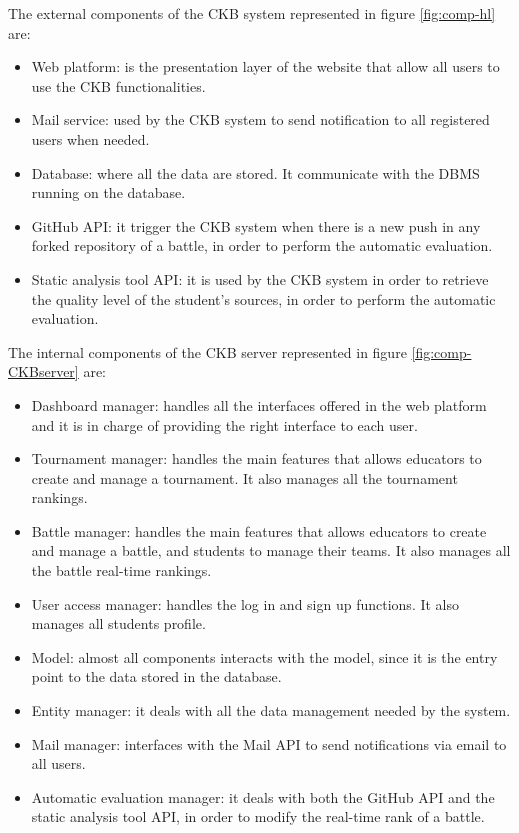 The external components of the CKB system represented in figure \ref{fig:comp-hl} are:
\begin{itemize}
    \item Web platform: is the presentation layer of the website that allow all users to use the CKB functionalities.
    \item Mail service: used by the CKB system to send notification to all registered users when needed.
    \item Database: where all the data are stored. It communicate with the DBMS running on the database.
    \item GitHub API: it trigger the CKB system when there is a new push in any forked repository of a battle, in order to perform the automatic evaluation. 
    \item Static analysis tool API: it is used by the CKB system in order to retrieve the quality level of the student's sources, in order to perform the automatic evaluation. 
\end{itemize}

The internal components of the CKB server represented in figure \ref{fig:comp-CKBserver} are:
\begin{itemize}
    \item Dashboard manager: handles all the interfaces offered in the web platform and it is in charge of providing the right interface to each user.
    \item Tournament manager: handles the main features that allows educators to create and manage a tournament. It also manages all the tournament rankings.
    \item Battle manager: handles the main features that allows educators to create and manage a battle, and students to manage their teams. It also manages all the battle real-time rankings.
    \item User access manager: handles the log in and sign up functions. It also manages all students profile.
    \item Model: almost all components interacts with the model, since it is the entry point to the data stored in the database.
    \item Entity manager: it deals with all the data management needed by the system.
    \item Mail manager: interfaces with the Mail API to send notifications via email to all users.
    \item Automatic evaluation manager: it deals with both the GitHub API and the static analysis tool API, in order to modify the real-time rank of a battle.
\end{itemize}

